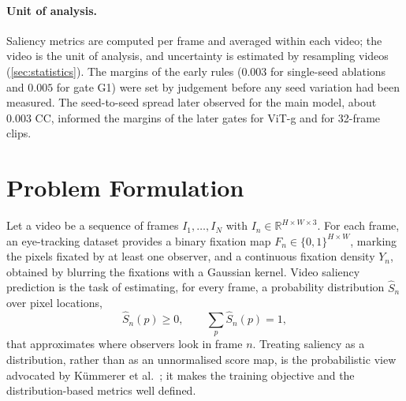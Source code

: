 \paragraph{Unit of analysis.} Saliency metrics are computed per frame and
averaged within each video; the video is the unit of analysis, and
uncertainty is estimated by resampling videos (\cref{sec:statistics}).
The margins of the early rules ($0.003$ for single-seed ablations and $0.005$
for gate G1) were set by judgement before any seed variation had been measured.
The seed-to-seed spread later observed for the main model, about $0.003$ \acrshort{CC},
informed the margins of the later gates for \acrshort{ViT}-g and for 32-frame clips.

\section{Problem Formulation}\label{sec:formulation}

Let a video be a sequence of frames $I_1,\dots,I_N$ with
$I_n\in\mathbb{R}^{H\times W\times3}$. For each frame, an eye-tracking dataset
provides a binary fixation map $F_n\in\{0,1\}^{H\times W}$, marking the pixels
fixated by at least one observer, and a continuous fixation density $Y_n$,
obtained by blurring the fixations with a Gaussian kernel. Video saliency
prediction is the task of estimating, for every frame, a probability
distribution $\hat S_n$ over pixel locations,
\begin{equation}
  \hat S_n(p)\geq0, \qquad \sum_{p}\hat S_n(p)=1,
  \label{eq:task}
\end{equation}
that approximates where observers look in frame $n$. Treating saliency as a
distribution, rather than as an unnormalised score map, is the
probabilistic view advocated by K\"ummerer et
al.~\cite{kummerer2015information,kummerer2018saliency}; it makes the
training objective and the distribution-based metrics well defined.

